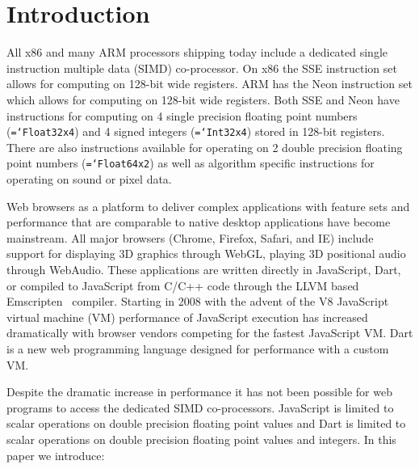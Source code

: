\documentclass{sigplanconf}
\newcommand{\ttt}[1]{{\texttt{\hyphenchar\font=`\-\relax #1}}}%
\begin{document}
\section{Introduction}

All x86 and many ARM processors shipping today include a dedicated single
instruction multiple data (SIMD) co-processor.  On x86 the SSE instruction set
allows for computing on 128-bit wide registers. ARM has the Neon instruction set
which allows for computing on 128-bit wide registers. Both SSE and Neon have
instructions for computing on 4 single precision floating point numbers
(\ttt{Float32x4}) and 4 signed integers (\ttt{Int32x4}) stored in 128-bit
registers. There are also instructions available for operating on 2 double
precision floating point numbers (\ttt{Float64x2}) as well as algorithm specific
instructions for operating on sound or pixel data.

Web browsers as a platform to deliver complex applications with feature sets and
performance that are comparable to native desktop applications have become
mainstream. All major browsers (Chrome, Firefox, Safari, and IE) include support
for displaying 3D graphics through WebGL, playing 3D positional audio through
WebAudio. These applications are written directly in JavaScript, Dart, or
compiled to JavaScript from C/C++ code through the LLVM based
Emscripten~\cite{emscripten} compiler. Starting in 2008 with the advent of the
V8 JavaScript virtual machine (VM) performance of JavaScript execution has
increased dramatically with browser vendors competing for the fastest JavaScript
VM. Dart is a new web programming language designed for performance with a
custom VM.

Despite the dramatic increase in performance it has not been possible for web
programs to access the dedicated SIMD co-processors. JavaScript is limited to
scalar operations on double precision floating point values and Dart is limited
to scalar operations on double precision floating point values and integers. In
this paper we introduce:
\end{document}
